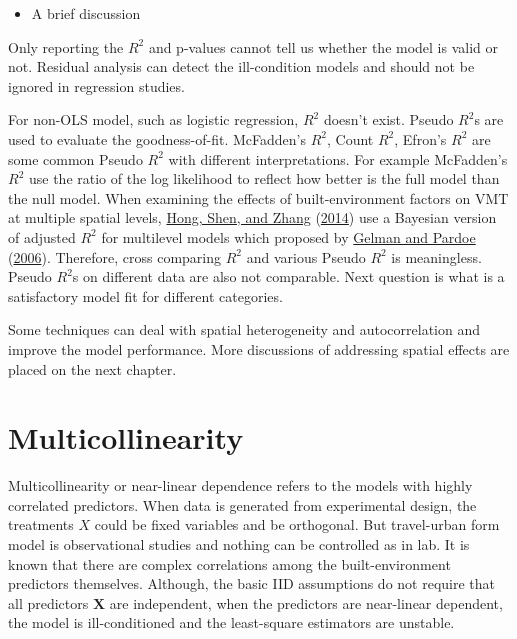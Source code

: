 \documentclass[
  11pt,
  openany]{memoir}
\providecommand{\tightlist}{%
  \setlength{\itemsep}{0pt}\setlength{\parskip}{0pt}}
\begin{document}
\begin{itemize}
\tightlist
\item
  A brief discussion
\end{itemize}

Only reporting the \(R^2\) and p-values cannot tell us whether the model is valid or not.
Residual analysis can detect the ill-condition models and should not be ignored in regression studies.

For non-OLS model, such as logistic regression, \(R^2\) doesn't exist. Pseudo \(R^2\)s are used to evaluate the goodness-of-fit. McFadden's \(R^2\), Count \(R^2\), Efron's \(R^2\) are some common Pseudo \(R^2\) with different interpretations. For example McFadden's \(R^2\) use the ratio of the log likelihood to reflect how better is the full model than the null model. When examining the effects of built-environment factors on VMT at multiple spatial levels, \protect\hyperlink{ref-hongHowBuiltenvironmentFactors2014}{Hong, Shen, and Zhang} (\protect\hyperlink{ref-hongHowBuiltenvironmentFactors2014}{2014}) use a Bayesian version of adjusted \(R^2\) for multilevel models which proposed by \protect\hyperlink{ref-gelmanBayesianMeasuresExplained2006}{Gelman and Pardoe} (\protect\hyperlink{ref-gelmanBayesianMeasuresExplained2006}{2006}).
Therefore, cross comparing \(R^2\) and various Pseudo \(R^2\) is meaningless. Pseudo \(R^2\)s on different data are also not comparable.
Next question is what is a satisfactory model fit for different categories.

Some techniques can deal with spatial heterogeneity and autocorrelation and improve the model performance. More discussions of addressing spatial effects are placed on the next chapter.

\hypertarget{multicollinearity}{%
\section{Multicollinearity}\label{multicollinearity}}

Multicollinearity or near-linear dependence refers to the models with highly correlated predictors. When data is generated from experimental design, the treatments \(X\) could be fixed variables and be orthogonal. But travel-urban form model is observational studies and nothing can be controlled as in lab. It is known that there are complex correlations among the built-environment predictors themselves.
Although, the basic IID assumptions do not require that all predictors \(\mathbf{X}\) are independent, when the predictors are near-linear dependent, the model is ill-conditioned and the least-square estimators are unstable.
\end{document}
